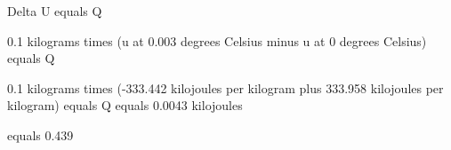 Delta U equals Q

0.1 kilograms times (u at 0.003 degrees Celsius minus u at 0 degrees Celsius) equals Q

0.1 kilograms times (-333.442 kilojoules per kilogram plus 333.958 kilojoules per kilogram) equals Q equals 0.0043 kilojoules

equals 0.439